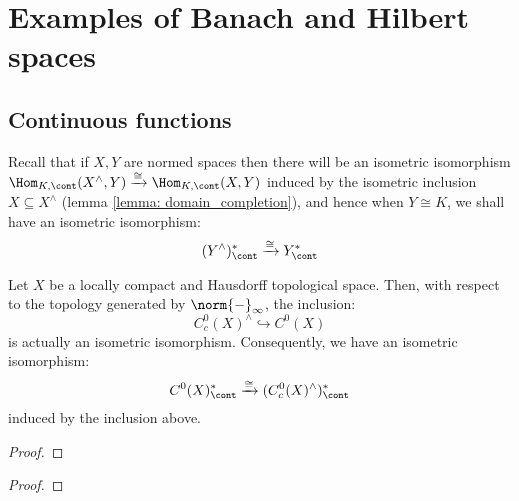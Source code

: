 \section{Examples of Banach and Hilbert spaces}
    \subsection{Continuous functions}
        Recall that if $X, Y$ are normed spaces then there will be an isometric isomorphism $\Hom_{K, \cont}(X^{\wedge}, Y) \xrightarrow[]{\cong} \Hom_{K, \cont}(X, Y)$ induced by the isometric inclusion $X \subseteq X^{\wedge}$ (lemma \ref{lemma: domain_completion}), and hence when $Y \cong K$, we shall have an isometric isomorphism:
            $$(Y^{\wedge})^*_{\cont} \xrightarrow[]{\cong} Y^*_{\cont}$$
            
        \begin{lemma} \label{lemma: approximating_continuous_functions_by_compactly_supported_ones}
            Let $X$ be a locally compact and Hausdorff topological space. Then, with respect to the topology generated by $\norm{-}_{\infty}$, the inclusion:
                $$C^0_c(X)^{\wedge} \hookrightarrow C^0(X)$$
            is actually an isometric isomorphism. Consequently, we have an isometric isomorphism:
                $$C^0(X)^*_{\cont} \xrightarrow[]{\cong} (C^0_c(X)^{\wedge})^*_{\cont}$$
            induced by the inclusion above. 
        \end{lemma}
            \begin{proof}
                
            \end{proof}
            
        \begin{theorem} \label{theorem: measures_as_linear_functionals}
            
        \end{theorem}
            \begin{proof}
                
            \end{proof}

